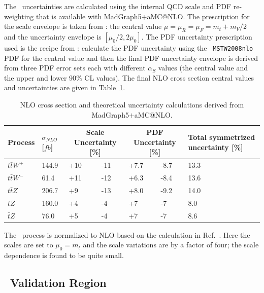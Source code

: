 The \ttV\ uncertainties are calculated
using the internal QCD scale and PDF re-weighting that is available with
 MadGraph5$+$aMC@NLO. The prescription for the scale envelope is taken from
\cite{Garzelli:2012bn}: the central value $\mu=\mu_{R}=\mu_{F}=m_t+m_V/2$
and the uncertainty envelope is $[\mu_{0}/2,2\mu_{0}]$. The PDF
uncertainty prescription used is the recipe from
\cite{Campbell:2012dh}: calculate the PDF uncertainty using the {\tt
MSTW2008nlo}~\cite{Martin:2009iq} PDF for the central value and then the final PDF
uncertainty envelope is derived from three PDF error sets each with
different $\alpha_S$ values (the central value and the upper and lower
90\% CL values). The final NLO cross section central values and
uncertainties are given in Table~\ref{tab:ttVXSunc}.

\begin{table}%
\begin{center}
\caption{NLO cross section and theoretical uncertainty
  calculations derived from MadGraph5$+$aMC@NLO.}
\label{tab:ttVXSunc}
\begin{tabular}{l|p{}|p{}|p{}|p{}|p{}|p{}}
\hline
Process & $\sigma_{NLO}$ [$fb$] & \multicolumn{2}{c|}{Scale
Uncertainty [\%]} & \multicolumn{2}{c|}{PDF Uncertainty [\%]} & Total
symmetrized uncertainty [\%] \\
\hline
\hline
$t\bar{t}W^{+}$ & 144.9 & +10 & -11 & +7.7 & -8.7 & 13.3 \\
$t\bar{t}W^{-}$ & 61.4  & +11 & -12 & +6.3 & -8.4 & 13.6 \\
$t\bar{t}Z$     & 206.7 & +9  & -13 & +8.0 & -9.2 & 14.0 \\
$tZ$            & 160.0 & +4  & -4  & +7   & -7   & 8.0 \\
$\bar{t}Z$      & 76.0  & +5  & -4  & +7   & -7   & 8.6 \\
\hline
\end{tabular}
\end{center}
\end{table}

The \tZ\ process is normalized to NLO based on the calculation in Ref.~\cite{Campbell:2013yla}.  Here the scales are set to $\mu_0 = m_t$ and the scale variations are by a factor of four; the scale dependence is found to be quite small.


\subsection{\ttZ\ Validation Region}

